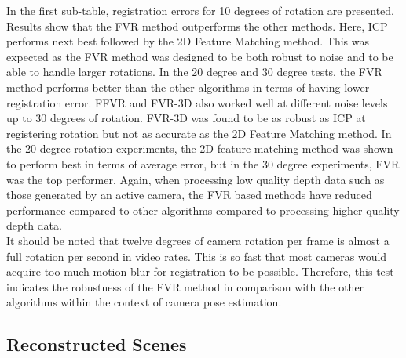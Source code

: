 In the first sub-table, registration errors for 10 degrees of rotation are presented. Results show that the FVR method outperforms the other methods. Here, ICP performs next best followed by the 2D Feature Matching method. This was expected as the FVR method was designed to be both robust to noise and to be able to handle larger rotations. In the 20 degree and 30 degree tests, the FVR method performs better than the other algorithms in terms of having lower registration error. FFVR and FVR-3D also worked well at different noise levels up to 30 degrees of rotation. FVR-3D was found to be as robust as ICP at registering rotation but not as accurate as the 2D Feature Matching method. In the 20 degree rotation experiments, the 2D feature matching method was shown to perform best in terms of average error, but in the 30 degree experiments, FVR was the top performer. Again, when processing low quality depth data such as those generated by an active camera, the FVR based methods have reduced performance compared to other algorithms compared to processing higher quality depth data. \\ 

It should be noted that twelve degrees of camera rotation per frame is almost a full rotation per second in video rates. This is so fast that most cameras would acquire too much motion blur for registration to be possible. Therefore, this test indicates the robustness of the FVR method in comparison with the other algorithms within the context of camera pose estimation. \\


\subsection{Reconstructed Scenes}
\label{Sec:FVRQual1Exp}

